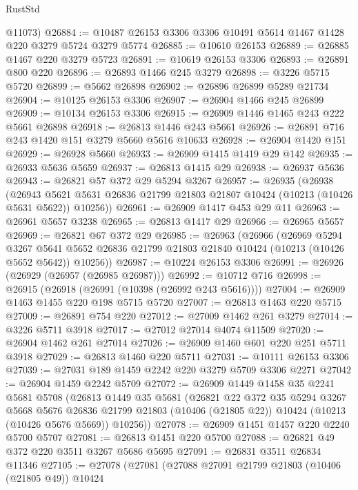 \begin{lexlean}{RustStd}
\begin{coremodule}
      @11073)
@26884 := @10487 @26153 @3306 @3306 @10491 @5614 @1467 @1428 @220 @3279 @5724 @3279 @5774
@26885 := @10610 @26153
@26889 := @26885 @1467 @220 @3279 @5723
@26891 := @10619 @26153 @3306
@26893 := @26891 @800 @220
@26896 := @26893 @1466 @245 @3279
@26898 := @3226 @5715 @5720
@26899 := @5662 @26898
@26902 := @26896 @26899 @5289 @21734
@26904 := @10125 @26153 @3306
@26907 := @26904 @1466 @245 @26899
@26909 := @10134 @26153 @3306
@26915 := @26909 @1446 @1465 @243 @222 @5661 @26898
@26918 := @26813 @1446 @243 @5661
@26926 := @26891 @716 @243 @1420 @151 @3279 @5660 @5616 @10633
@26928 := @26904 @1420 @151
@26929 := @26928 @5660
@26933 := @26909 @1415 @1419 @29 @142
@26935 := @26933 @5636 @5659
@26937 := @26813 @1415 @29
@26938 := @26937 @5636
@26943 := @26821 @57 @372 @29 @5294 @3267
@26957 := @26935
    (@26938
      (@26943 @5621 @5631 @26836 @21799 @21803 @21807 @10424 (@10213 (@10426 @5631 @5622)) @10256))
@26961 := @26909 @1417 @453 @29 @11
@26963 := @26961 @5657 @3238
@26965 := @26813 @1417 @29
@26966 := @26965 @5657
@26969 := @26821 @67 @372 @29
@26985 := @26963
    (@26966
      (@26969
        @5294
        @3267
        @5641
        @5652
        @26836
        @21799
        @21803
        @21840
        @10424
        (@10213 (@10426 @5652 @5642))
        @10256))
@26987 := @10224 @26153 @3306
@26991 := @26926 (@26929 (@26957 (@26985 @26987)))
@26992 := @10712 @716
@26998 := @26915 (@26918 (@26991 (@10398 (@26992 @243 @5616))))
@27004 := @26909 @1463 @1455 @220 @198 @5715 @5720
@27007 := @26813 @1463 @220 @5715
@27009 := @26891 @754 @220
@27012 := @27009 @1462 @261 @3279
@27014 := @3226 @5711 @3918
@27017 := @27012 @27014 @4074 @11509
@27020 := @26904 @1462 @261 @27014
@27026 := @26909 @1460 @601 @220 @251 @5711 @3918
@27029 := @26813 @1460 @220 @5711
@27031 := @10111 @26153 @3306
@27039 := @27031 @189 @1459 @2242 @220 @3279 @5709 @3306 @2271
@27042 := @26904 @1459 @2242 @5709
@27072 := @26909
    @1449
    @1458
    @35
    @2241
    @5681
    @5708
    (@26813
      @1449
      @35
      @5681
      (@26821
        @22
        @372
        @35
        @5294
        @3267
        @5668
        @5676
        @26836
        @21799
        @21803
        (@10406 (@21805 @22))
        @10424
        (@10213 (@10426 @5676 @5669))
        @10256))
@27078 := @26909 @1451 @1457 @220 @2240 @5700 @5707
@27081 := @26813 @1451 @220 @5700
@27088 := @26821 @49 @372 @220 @3511 @3267 @5686 @5695
@27091 := @26831 @3511 @26834 @11346
@27105 := @27078
    (@27081
      (@27088
        @27091
        @21799
        @21803
        (@10406 (@21805 @49))
        @10424

\end{coremodule}
\end{lexlean}
